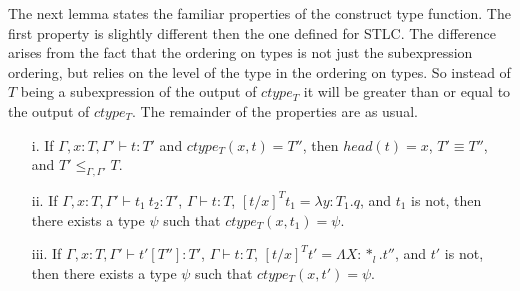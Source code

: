 \noindent The next lemma states the familiar properties of the
construct type function.  The first property is slightly different
then the one defined for STLC.  The difference arises from the fact
that the ordering on types is not just the subexpression ordering, but
relies on the level of the type in the ordering on types.  So instead
of $T$ being a subexpression of the output of $ctype_T$ it will
be greater than or equal to the output of $ctype_T$.  The remainder
of the properties are as usual.

\begin{lemma}
  \label{lemma:ctype_props_ssf}
  \begin{itemize}
  \item[i.] If $\Gamma,x:T,\Gamma' \vdash t:T'$ and $ctype_T(x,t) = T''$, then 
    $head(t) = x$, $T' \equiv T''$, and $T' \leq_{\Gamma,\Gamma'} T$.

  \item[ii.] If $\Gamma,x:T,\Gamma' \vdash t_1\ t_2:T'$, $\Gamma \vdash t:T$,
    $[t/x]^T t_1 = \lambda y:T_1.q$, and $t_1$ is not, then there exists a type
    $\psi$ such that $ctype_T(x,t_1) = \psi$.

  \item[iii.] If $\Gamma,x:T,\Gamma' \vdash t'[T'']:T'$, $\Gamma \vdash t:T$,
    $[t/x]^T t' = \Lambda X:*_l.t''$, and $t'$ is not, then there exists a type
    $\psi$ such that $ctype_T(x,t') = \psi$.
  \end{itemize}
\end{lemma}
